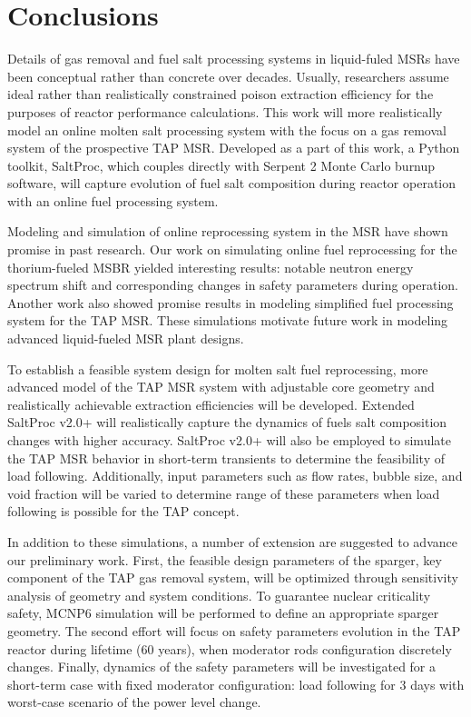 \section{Conclusions}
Details of gas removal and fuel salt processing systems in liquid-fuled 
\glspl{MSR} have been conceptual rather than concrete over decades. Usually, 
researchers assume ideal rather than realistically constrained poison 
extraction efficiency for the purposes of reactor performance calculations. 
This work will more realistically model an online molten salt processing 
system with the focus on a gas removal system of the prospective \gls{TAP} 
\gls{MSR}. Developed as a part of this work, a Python toolkit, SaltProc, which 
couples directly with Serpent 2 Monte Carlo burnup software, will capture 
evolution of fuel salt composition during reactor operation with an online 
fuel processing system.

Modeling and simulation of online reprocessing system in the \gls{MSR} have 
shown promise in past research. Our work on simulating online fuel 
reprocessing for the thorium-fueled \gls{MSBR} yielded interesting results: 
notable neutron energy spectrum shift and corresponding changes in safety 
parameters during operation. Another work also showed promise results in 
modeling simplified fuel processing system for the \gls{TAP} \gls{MSR}. These 
simulations motivate future work in modeling advanced liquid-fueled \gls{MSR} 
plant designs.

To establish a feasible system design for molten salt fuel reprocessing, more 
advanced model of the \gls{TAP} \gls{MSR} system with adjustable core geometry 
and realistically achievable extraction efficiencies will be developed. 
Extended SaltProc v2.0+ will realistically capture the dynamics of fuels salt 
composition changes with higher accuracy. SaltProc v2.0+ will also be employed 
to simulate the \gls{TAP} \gls{MSR} behavior in short-term transients to 
determine the feasibility of load following. Additionally, input parameters 
such as flow rates, bubble size, and void fraction will be varied to determine 
range of these parameters when load following is possible for the \gls{TAP} 
concept.

In addition to these simulations, a number of extension are suggested to 
advance our preliminary work. First, the feasible design parameters of the 
sparger, key component of the \gls{TAP} gas removal system, will be optimized 
through sensitivity analysis of geometry and system conditions. To guarantee 
nuclear criticality safety, MCNP6 simulation will be performed to define an 
appropriate sparger geometry. The second effort will focus on safety 
parameters evolution in the \gls{TAP} reactor during lifetime (60 years),  
when moderator rods configuration discretely changes. Finally, dynamics of the 
safety parameters will be investigated for a short-term case with fixed 
moderator configuration: load following for 3 days with worst-case scenario of 
the power level change. 

